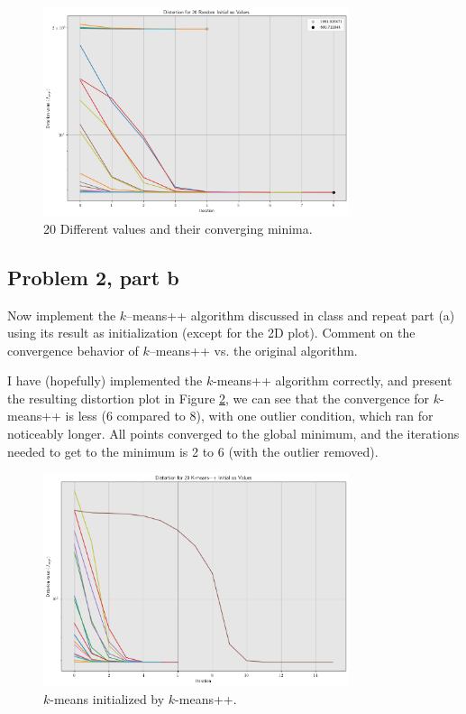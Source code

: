 \begin{figure}
    \centering
    \includegraphics[width=0.8\textwidth]{Figure/Different vals.png}
    \caption{20 Different values and their converging minima.}
    \label{fig:Differentvals}
\end{figure}

\clearpage
\newpage
\subsection{Problem 2, part b}
Now implement the $k$–means++ algorithm discussed in class and repeat part (a) using its result as initialization (except for the 2D plot). Comment on the convergence behavior of $k$–means++ vs. the original algorithm.
\partbreak
\begin{solution}

    I have (hopefully) implemented the $k$-means++ algorithm correctly, and present the resulting distortion plot in Figure \ref{fig:k-means++}, we can see that the convergence for $k$-means++ is less (6 compared to 8), with one outlier condition, which ran for noticeably longer. All points converged to the global minimum, and the iterations needed to get to the minimum is 2 to 6 (with the outlier removed). 
\end{solution}

\vspace{4cm}
\begin{figure}[!ht]
    \centering
    \includegraphics[width = 0.8\textwidth]{Figure/kmeans++.png}
    \caption{$k$-means initialized by $k$-means++.}
    \label{fig:k-means++}
\end{figure}


